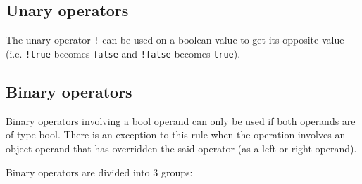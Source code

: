 \subsection{Unary operators}
\label{sec:orgb412ce4}

The unary operator \texttt{!} can be used on a boolean value to get its opposite
value (i.e. \texttt{!true} becomes \texttt{false} and \texttt{!false} becomes
\texttt{true}).

\subsection{Binary operators}
\label{sec:org030ae50}

Binary operators involving a bool operand can only be used if both operands are
of type bool. There is an exception to this rule when the operation involves an
object operand that has overridden the said operator (as a left or right
operand).

Binary operators are divided into 3 groups:

